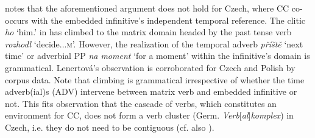 \documentclass[output=paper,colorlinks,citecolor=brown]{langscibook}
\begin{document}
\begin{sloppypar}
\noindent \citet{Lenertova2004} notes that the aforementioned argument does not hold for Czech, where CC co-occurs with the embedded infinitive’s independent temporal reference. The clitic \textit{ho} ‘him.{\ACC}’ in  has climbed to the matrix domain headed by the past tense verb \textit{rozhodl} ‘decide.{\PST.\SG.}\textsc{m}’. However, the realization of the temporal adverb \textit{příště} ‘next time’ or adverbial PP \textit{na moment} ‘for a moment’ within the infinitive’s domain is grammatical. Lenertová’s observation is corroborated for Czech  and Polish  by corpus data. Note that climbing is grammatical irrespective of whether the time adverb(ial)s (ADV) intervene between matrix verb and embedded infinitive or not. This fits  observation that the cascade of verbs, which constitutes an environment for CC, does not form a verb cluster (Germ. \textit{Verb}[\textit{al}]\textit{komplex}) in Czech, i.e. they do not need to be contiguous (cf. also \citealt[313]{Golden2008}).\largerpage
\end{sloppypar}
\end{document}
